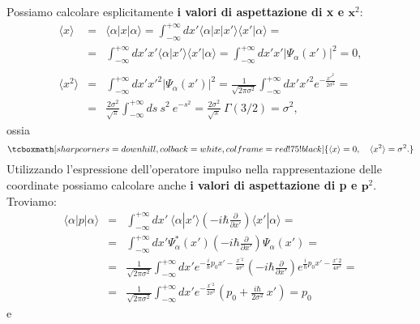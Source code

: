 \documentclass[a4paper,12pt,oneside]{book}
\begin{document}
Possiamo calcolare esplicitamente \textbf{i valori di aspettazione di x e $\mathbf x^2$}:
	\begin{eqnarray}
		\langle x \rangle &=& \langle \alpha | x | \alpha \rangle = \int_{-\infty}^{+\infty} dx' \langle \alpha | x | x' \rangle \langle x' | \alpha \rangle =  \nonumber \\
		&=&  \int_{-\infty}^{+\infty} dx' x' \langle \alpha | x' \rangle \langle x' | \alpha \rangle = \int_{-\infty}^{+\infty} dx' x' |\Psi_\alpha (x')|^2 = 0,\\
		\nonumber \\
		\langle x^2 \rangle &=&  \int_{-\infty}^{+\infty} dx' x'^2 |\Psi_\alpha (x')|^2 = \frac{1}{\sqrt{2 \pi \sigma^2}} \int_{-\infty}^{+\infty} dx' x'^2 e^{- \frac{x'^2}{2 \sigma^2}} =\nonumber  \\
		&=& \frac{2 \sigma^2}{\sqrt{\pi}} \int_{-\infty}^{+\infty} ds ~ s^2 ~e^{-s^2} = \frac{2 \sigma^2}{\sqrt{\pi}} ~ \Gamma(3/2) = \sigma^2,
	\end{eqnarray}
ossia
	\begin{equation}
		\tcboxmath[sharp corners=downhill ,colback=white,colframe=red!75!black]{
			\langle x \rangle = 0, \quad \langle x^2 \rangle = \sigma^2.
			}
	\end{equation}
Utilizzando l'espressione dell'operatore impulso nella rappresentazione delle coordinate possiamo calcolare anche \textbf{i valori di aspettazione di p e $\mathbf p^2$}. Troviamo:
	\begin{eqnarray}
		\langle \alpha | p | \alpha \rangle  &=&  \int_{-\infty}^{+\infty} dx'\ \langle \alpha | x' \rangle \left(-i \hbar \frac{\partial}{\partial x'} \right) \langle x' | \alpha \rangle = \nonumber\\
		&=& \int_{-\infty}^{+\infty} dx' \Psi ^* _\alpha(x') \left(-i \hbar \frac{\partial}{\partial x'} \right) \Psi_\alpha(x') = \nonumber \\
		&=& \frac{1}{\sqrt{2 \pi \sigma^2}} \int_{-\infty}^{+\infty} dx' e^{-\frac{i}{\hbar}p_0 x' - \frac{x^{\prime \,2}}{4 \sigma^2}} \left(-i \hbar \frac{\partial}{\partial x'} \right) e^{\frac{i}{\hbar}p_0 x' - \frac{x{\prime \,2}}{4 \sigma^2}} = \nonumber \\
		&=& \frac{1}{\sqrt{2 \pi \sigma^2}} \int_{-\infty}^{+\infty} dx'  e^{- \frac{x^{\prime \,2}}{2 \sigma^2}} \left(p_0 + \frac{i \hbar}{2 \sigma^2} ~x' \right) = p_0
	\end{eqnarray}
e
\end{document}
